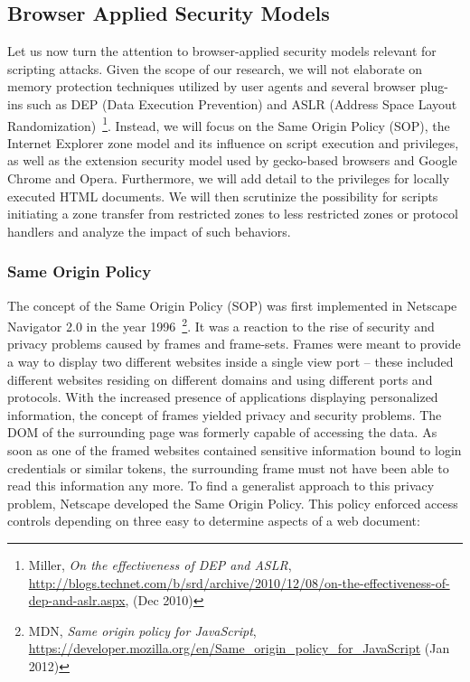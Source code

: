     \subsection{Browser Applied Security Models}
    \label{subsubsec:2.4.1.browser_applied_security_models}

    Let us now turn the attention to browser-applied security models relevant for scripting attacks. Given the scope of our research, we will not elaborate on memory protection techniques utilized by user agents and several browser plug-ins such as DEP (Data Execution Prevention) and ASLR (Address Space Layout Randomization)~\footnote{Miller, \textit{On the effectiveness of DEP and ASLR}, \url{http://blogs.technet.com/b/srd/archive/2010/12/08/on-the-effectiveness-of-dep-and-aslr.aspx}, (Dec 2010)}. Instead, we will focus on the Same Origin Policy (SOP), the Internet Explorer zone model and its influence on script execution and privileges, as well as the extension security model used by gecko-based browsers and Google Chrome and Opera. Furthermore, we will add detail to the privileges for locally executed HTML documents. We will then scrutinize the possibility for scripts initiating a zone transfer from restricted zones to less restricted zones or protocol handlers and analyze the impact of such behaviors.

      \subsubsection{Same Origin Policy}
      \label{subsubsubsec:2.4.1.1.same_origin_policy}

      The concept of the Same Origin Policy (SOP) was first implemented in Netscape Navigator 2.0 in the year 1996~\footnote{MDN, \textit{Same origin policy for JavaScript}, \url{https://developer.mozilla.org/en/Same_origin_policy_for_JavaScript} (Jan 2012)}. It was a reaction to the rise of security and privacy problems caused by frames and frame-sets. Frames were meant to provide a way to display two different websites inside a single view port -- these included different websites residing on different domains and using different ports and protocols. With the increased presence of applications displaying personalized information, the concept of frames yielded privacy and security problems. The DOM of the surrounding page was formerly capable of accessing the data. As soon as one of the framed websites contained sensitive information bound to login credentials or similar tokens, the surrounding frame must not have been able to read this information any more. To find a generalist approach to this privacy 
problem, Netscape developed the Same Origin Policy. This policy enforced access controls depending on three easy to determine aspects of a web document:

